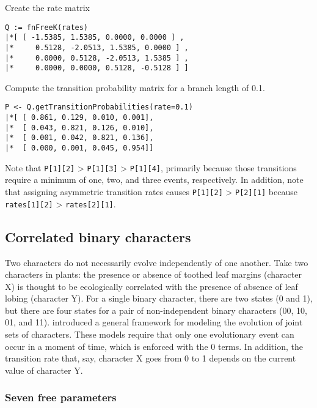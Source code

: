 Create the rate matrix

{\tt \begin{snugshade*}
\begin{lstlisting}
Q := fnFreeK(rates)
|*[ [ -1.5385, 1.5385, 0.0000, 0.0000 ] ,
|*     0.5128, -2.0513, 1.5385, 0.0000 ] ,
|*     0.0000, 0.5128, -2.0513, 1.5385 ] ,
|*     0.0000, 0.0000, 0.5128, -0.5128 ] ]
\end{lstlisting}
\end{snugshade*}}

Compute the transition probability matrix for a branch length of 0.1.

{\tt \begin{snugshade*}
\begin{lstlisting}
P <- Q.getTransitionProbabilities(rate=0.1)
|*[ [ 0.861, 0.129, 0.010, 0.001],
|*  [ 0.043, 0.821, 0.126, 0.010],
|*  [ 0.001, 0.042, 0.821, 0.136],
|*  [ 0.000, 0.001, 0.045, 0.954]]
\end{lstlisting}
\end{snugshade*}}

Note that {\tt P[1][2]} > {\tt P[1][3]} > {\tt P[1][4]}, primarily because those transitions require a minimum of one, two, and three events, respectively.
In addition, note that assigning asymmetric transition rates causes {\tt P[1][2]} > {\tt P[2][1]} because {\tt rates[1][2]} > {\tt rates[2][1]}.


\subsection{Correlated binary characters}

Two characters do not necessarily evolve independently of one another.
Take two characters in plants: the presence or absence of toothed leaf margins (character X) is thought to be ecologically correlated with the presence of absence of leaf lobing (character Y).
For a single binary character, there are two states (0 and 1), but there are four states for a pair of non-independent binary characters (00, 10, 01, and 11).
\citet{Pagel2004} introduced a general framework for modeling the evolution of joint sets of characters.
These models require that only one evolutionary event can occur in a moment of time, which is enforced with the 0 terms.
In addition, the transition rate that, say, character X goes from 0 to 1 depends on the current value of character Y.

\subsubsection{Seven free parameters}

